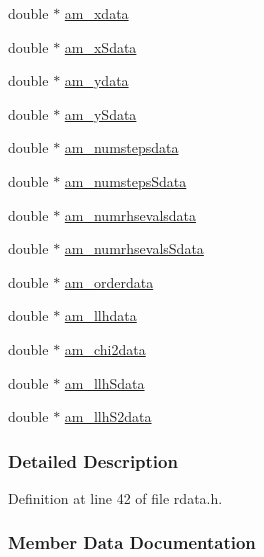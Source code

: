 \begin{DoxyCompactItemize}
double $\ast$ \hyperlink{struct_return_data_ad99b08eb835733c2416a1a0004e4a491}{am\+\_\+xdata}
\item 
double $\ast$ \hyperlink{struct_return_data_a097369567440c923ac24256e75ab3e89}{am\+\_\+x\+Sdata}
\item 
double $\ast$ \hyperlink{struct_return_data_a24568582aa8de699ea1ce53323ff26ca}{am\+\_\+ydata}
\item 
double $\ast$ \hyperlink{struct_return_data_aa2089cdd16d3cb3c9b85f99f570197d1}{am\+\_\+y\+Sdata}
\item 
double $\ast$ \hyperlink{struct_return_data_a2ebada170b4bc6a2337794e4ec08d77c}{am\+\_\+numstepsdata}
\item 
double $\ast$ \hyperlink{struct_return_data_a6852d3762d59842903ef737ed511dc43}{am\+\_\+numsteps\+Sdata}
\item 
double $\ast$ \hyperlink{struct_return_data_a480d4eb0a1a568f64b8e939105a0b627}{am\+\_\+numrhsevalsdata}
\item 
double $\ast$ \hyperlink{struct_return_data_a77e958126968de6f5ee3bd1d22129641}{am\+\_\+numrhsevals\+Sdata}
\item 
double $\ast$ \hyperlink{struct_return_data_af792e4a1c5c23c5232ef9398e25de1a7}{am\+\_\+orderdata}
\item 
double $\ast$ \hyperlink{struct_return_data_af95fa143e0e524652f9a818f6288b544}{am\+\_\+llhdata}
\item 
double $\ast$ \hyperlink{struct_return_data_ae0fc05ce8c52bdda5c7bff541c79945d}{am\+\_\+chi2data}
\item 
double $\ast$ \hyperlink{struct_return_data_af72a5801bf4c6b957812c8b2471ecf41}{am\+\_\+llh\+Sdata}
\item 
double $\ast$ \hyperlink{struct_return_data_a9ea6527fa5408fa1ae074cdbd83ed11f}{am\+\_\+llh\+S2data}
\end{DoxyCompactItemize}


\subsubsection{Detailed Description}


Definition at line 42 of file rdata.\+h.



\subsubsection{Member Data Documentation}
\hypertarget{struct_return_data_a577298549da7c9dbe3d93fbf3bc17866}{}

